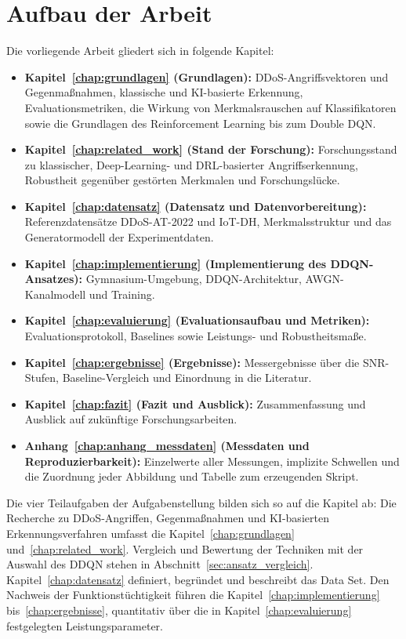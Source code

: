 \section{Aufbau der Arbeit}
Die vorliegende Arbeit gliedert sich in folgende Kapitel:
\begin{itemize}\raggedright
    \item \textbf{Kapitel~\ref{chap:grundlagen} (Grundlagen):} DDoS-Angriffsvektoren und Gegenmaßnahmen, klassische und KI-basierte Erkennung, Evaluationsmetriken, die Wirkung von Merkmalsrauschen auf Klassifikatoren sowie die Grundlagen des Reinforcement Learning bis zum Double DQN.
    \item \textbf{Kapitel~\ref{chap:related_work} (Stand der Forschung):} Forschungsstand zu klassischer, Deep-Learning- und DRL-basierter Angriffserkennung, Robustheit gegenüber gestörten Merkmalen und Forschungslücke.
    \item \textbf{Kapitel~\ref{chap:datensatz} (Datensatz und Datenvorbereitung):} Referenzdatensätze \mbox{DDoS-AT-2022} und \mbox{IoT-DH}, Merkmalsstruktur und das Generatormodell der Experimentdaten.
    \item \textbf{Kapitel~\ref{chap:implementierung} (Implementierung des DDQN-Ansatzes):} Gymnasium-Umgebung, DDQN-Architektur, AWGN-Kanalmodell und Training.
    \item \textbf{Kapitel~\ref{chap:evaluierung} (Evaluationsaufbau und Metriken):} Evaluationsprotokoll, Baselines sowie Leistungs- und Robustheitsmaße.
    \item \textbf{Kapitel~\ref{chap:ergebnisse} (Ergebnisse):} Messergebnisse über die SNR-Stufen, Baseline-Vergleich und Einordnung in die Literatur.
    \item \textbf{Kapitel~\ref{chap:fazit} (Fazit und Ausblick):} Zusammenfassung und Ausblick auf zukünftige Forschungsarbeiten.
    \item \textbf{Anhang~\ref{chap:anhang_messdaten} (Messdaten und Reproduzierbarkeit):} Einzelwerte aller Messungen, implizite Schwellen und die Zuordnung jeder Abbildung und Tabelle zum erzeugenden Skript.
\end{itemize}

Die vier Teilaufgaben der Aufgabenstellung bilden sich so auf die Kapitel ab: Die Recherche zu DDoS-Angriffen, Gegenmaßnahmen und KI-basierten Erkennungsverfahren umfasst die Kapitel~\ref{chap:grundlagen} und~\ref{chap:related_work}. Vergleich und Bewertung der Techniken mit der Auswahl des DDQN stehen in Abschnitt~\ref{sec:ansatz_vergleich}. Kapitel~\ref{chap:datensatz} definiert, begründet und beschreibt das Data Set. Den Nachweis der Funktionstüchtigkeit führen die Kapitel~\ref{chap:implementierung} bis~\ref{chap:ergebnisse}, quantitativ über die in Kapitel~\ref{chap:evaluierung} festgelegten Leistungsparameter.
